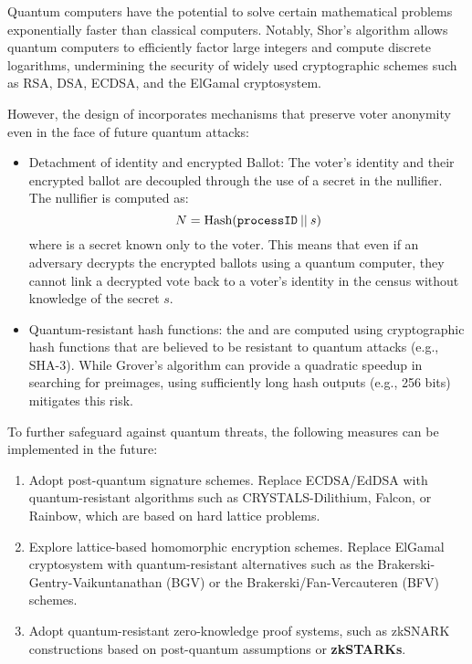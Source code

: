 Quantum computers have the potential to solve certain mathematical problems exponentially faster than classical computers. Notably, Shor's algorithm allows quantum computers to efficiently factor large integers and compute discrete logarithms, undermining the security of widely used cryptographic schemes such as RSA, DSA, ECDSA, and the ElGamal cryptosystem.

However, the design of \davinci incorporates mechanisms that preserve voter anonymity even in the face of future quantum attacks:

\begin{itemize}
	\item Detachment of identity and encrypted Ballot: The voter's identity and their encrypted ballot are decoupled through the use of a secret in the nullifier. The nullifier is computed as:
	$$ N = \text{Hash}(\texttt{processID} \:||\: s) $$	
	where is a secret known only to the voter. This means that even if an adversary decrypts the encrypted ballots using a quantum computer, they cannot link a decrypted vote back to a voter's identity in the census without knowledge of the secret $s$.
	\item Quantum-resistant hash functions: the \nullifier and \commitment are computed using cryptographic hash functions that are believed to be resistant to quantum attacks (e.g., SHA-3). While Grover's algorithm can provide a quadratic speedup in searching for preimages, using sufficiently long hash outputs (e.g., 256 bits) mitigates this risk.
\end{itemize}

To further safeguard against quantum threats, the following measures can be implemented in the future:

\begin{enumerate}
	\item Adopt post-quantum signature schemes. Replace ECDSA/EdDSA with quantum-resistant algorithms such as CRYSTALS-Dilithium, Falcon, or Rainbow, which are based on hard lattice problems.
	
	\item Explore lattice-based homomorphic encryption schemes. Replace ElGamal cryptosystem with quantum-resistant alternatives such as the Brakerski-Gentry-Vaikuntanathan (BGV) or the Brakerski/Fan-Vercauteren (BFV) schemes.
	
	\item Adopt quantum-resistant zero-knowledge proof systems, such as zkSNARK constructions based on post-quantum assumptions or \textbf{zkSTARKs}.
\end{enumerate}

